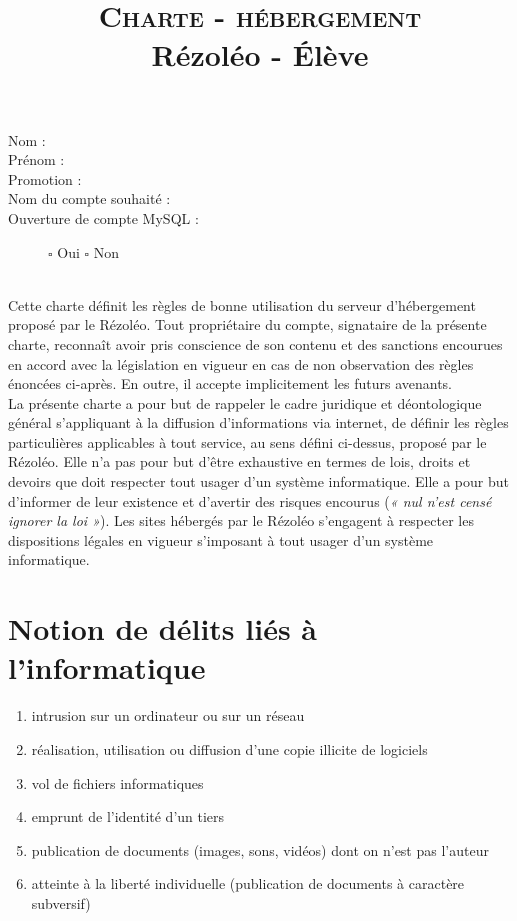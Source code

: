 \documentclass[10pt,a4paper]{article}
\title{{\Huge\textsc{Charte - hébergement}}\\ Rézoléo - Élève}
\date{}
\begin{document}
\maketitle
\thispagestyle{fancy}


\hrulefill
\begin{description}
\item[Nom :] \dotfill
\item[Prénom :]\dotfill
\item[Promotion :]\dotfill
\item[Nom du compte souhaité :]\dotfill
\item[Ouverture de compte MySQL :] \hspace{1cm} $\square$ Oui \hspace{3cm} $\square$ Non
\end{description}
\hrulefill
\\

Cette charte définit les règles de bonne utilisation du serveur d'hébergement proposé par le Rézoléo. Tout propriétaire du compte, signataire de la présente charte, reconnaît avoir pris conscience de son contenu et des sanctions encourues en accord avec la législation en vigueur en cas de non observation des règles énoncées ci-après. En outre, il accepte implicitement les futurs avenants.\\

La présente charte a pour but de rappeler le cadre juridique et déontologique général s'appliquant à la diffusion d'informations via internet, de définir les règles particulières applicables à tout service, au sens défini ci-dessus, proposé par le Rézoléo. Elle n'a pas pour but d'être exhaustive en termes de lois, droits et devoirs que doit respecter tout usager d'un système informatique. Elle a pour but d'informer de leur existence et d'avertir des risques encourus (\textit{« nul n'est censé ignorer la loi »}). Les sites hébergés par le Rézoléo s'engagent à respecter les dispositions légales en vigueur s'imposant à tout usager d'un système informatique.

\section{Notion de délits liés à l'informatique}
\begin{enumerate}
\item intrusion sur un ordinateur ou sur un réseau
\item réalisation, utilisation ou diffusion d'une copie illicite de logiciels
\item vol de fichiers informatiques
\item emprunt de l'identité d'un tiers
\item publication de documents (images, sons, vidéos) dont on n'est pas l'auteur
\item atteinte à la liberté individuelle (publication de documents à caractère subversif)
\end{enumerate}
\end{document}
